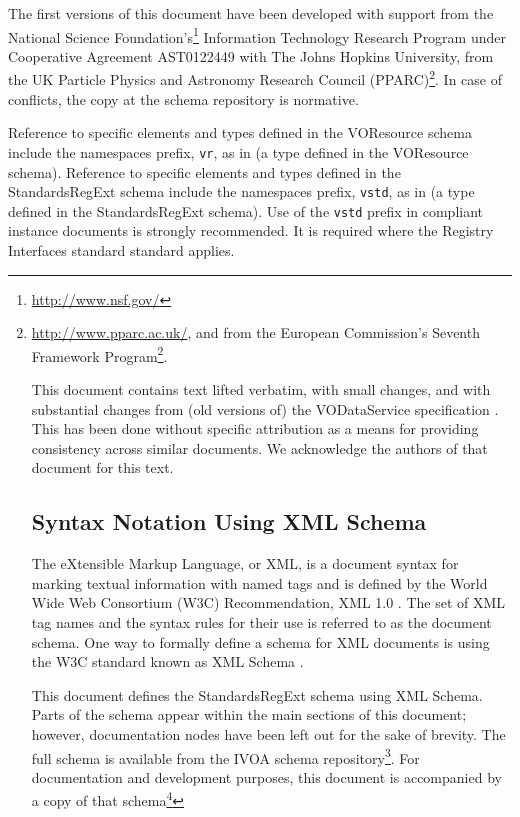 \documentclass[11pt,a4paper]{ivoa}
\begin{document}
The first versions of this document have been developed with support from the
National Science Foundation's\footnote{\url{http://www.nsf.gov/}}
Information Technology Research Program under Cooperative Agreement
AST0122449 with The Johns Hopkins University, from the
UK Particle Physics and Astronomy Research Council (PPARC)\footnote{\url{http://www.pparc.ac.uk/}, and from the
European Commission's Seventh Framework
Program\footnote{\url{http://cordis.europa.eu/fp7/capacities/home_en.html}}.

This document contains text lifted verbatim, with small changes, and
with substantial changes from (old versions of) the VODataService
specification \citep{2021ivoa.spec.1102D}.  This
has been done without specific attribution as a means for providing
consistency across similar documents.  We acknowledge the authors of
that document for this text.  



\subsection{Syntax Notation Using XML Schema}
The eXtensible Markup Language, or XML, is a document syntax for marking
textual information with named tags and is defined by the
World Wide Web Consortium (W3C) Recommendation,
XML 1.0 \citep{std:XML}.
The set of XML tag names and the syntax
rules for their use is referred to as the document schema.  One way to
formally define a schema for XML documents is using the W3C standard
known as XML Schema \citep{std:XSD}.


This document defines the StandardsRegExt schema using XML Schema.
Parts of the schema appear within the main sections of this document;
however, documentation nodes have been left out for the sake of brevity.
The full schema is available from the IVOA schema
repository\footnote{\url{https://ivoa.net/xml/index.html}}.  For
documentation and development purposes, this document is accompanied by
a copy of that
schema\footnote{}}.  In case of
conflicts, the copy at the schema repository is normative.

Reference to specific elements and types defined in the VOResource
schema include the namespaces prefix, \texttt{vr}, as in
 (a type defined in the VOResource schema).
Reference to specific elements and types defined in the StandardsRegExt
schema include the namespaces prefix, \texttt{vstd}, as in
 (a type defined in the StandardsRegExt schema).
Use of the \texttt{vstd} prefix in compliant instance documents is 
strongly recommended.  It is required where the Registry Interfaces
standard \citep{2018ivoa.spec.0723D} standard applies.
\end{document}
